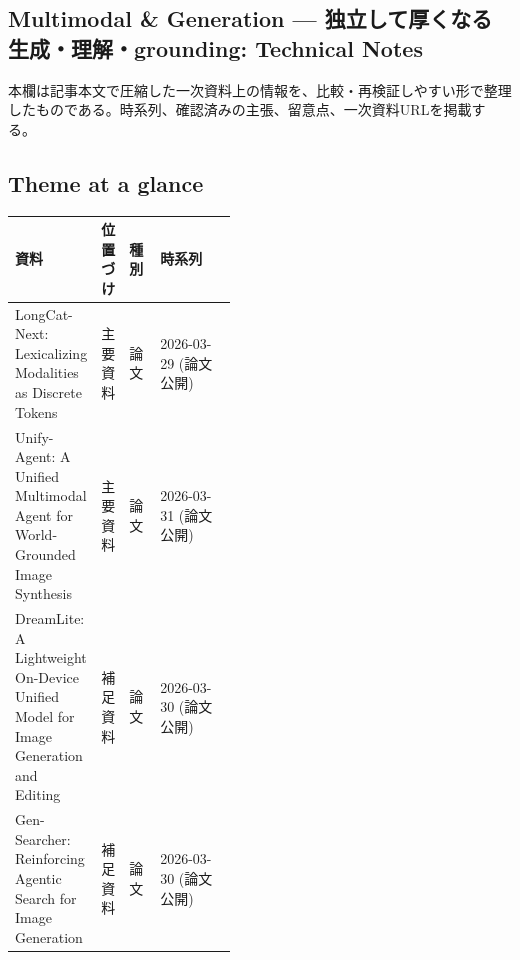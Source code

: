 \subsection*{Multimodal \& Generation — 独立して厚くなる生成・理解・grounding: Technical Notes}
本欄は記事本文で圧縮した一次資料上の情報を、比較・再検証しやすい形で整理したものである。時系列、確認済みの主張、留意点、一次資料URLを掲載する。
\medskip
\subsection*{Theme at a glance}
\begin{center}
\footnotesize
\begin{tabularx}{\linewidth}{@{}p{0.20\linewidth}p{0.10\linewidth}p{0.14\linewidth}X@{}}
\toprule
資料 & 位置づけ & 種別 & 時系列 \\
\midrule
LongCat-Next: Lexicalizing Modalities as Discrete Tokens & 主要資料 & 論文 & 2026-03-29 (論文公開) \\
Unify-Agent: A Unified Multimodal Agent for World-Grounded Image Synthesis & 主要資料 & 論文 & 2026-03-31 (論文公開) \\
DreamLite: A Lightweight On-Device Unified Model for Image Generation and Editing & 補足資料 & 論文 & 2026-03-30 (論文公開) \\
Gen-Searcher: Reinforcing Agentic Search for Image Generation & 補足資料 & 論文 & 2026-03-30 (論文公開) \\
\bottomrule
\end{tabularx}
\end{center}
\normalsize

